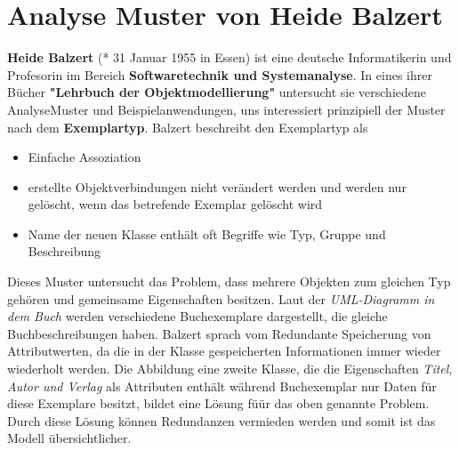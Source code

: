 \section{Analyse Muster von Heide Balzert}
\textbf{Heide Balzert} (* 31 Januar 1955 in Essen) ist eine deutsche Informatikerin und Profesorin im Bereich \textbf{Softwaretechnik und Systemanalyse}. In eines ihrer Bücher \textbf{"Lehrbuch der Objektmodellierung"} untersucht sie verschiedene AnalyseMuster und Beispielanwendungen, uns interessiert prinzipiell der Muster nach dem \textbf{Exemplartyp}. Balzert beschreibt den Exemplartyp als
\begin{itemize}
  \item{Einfache Assoziation}
  \item{erstellte Objektverbindungen nicht verändert werden und werden nur gelöscht, wenn das betrefende Exemplar gelöscht wird}
  \item{Name der neuen Klasse enthält oft Begriffe wie Typ, Gruppe und Beschreibung}
\end{itemize}
Dieses Muster untersucht das Problem, dass mehrere Objekten zum gleichen Typ gehören und gemeinsame Eigenschaften besitzen. Laut der \textit{UML-Diagramm in dem Buch} werden verschiedene Buchexemplare dargestellt, die gleiche Buchbeschreibungen haben. Balzert sprach vom Redundante Speicherung von Attributwerten, da die in der Klasse gespeicherten Informationen immer wieder wiederholt werden. Die Abbildung eine zweite Klasse, die die Eigenschaften \textit{Titel, Autor und Verlag} als Attributen enthält während Buchexemplar \cite{Balzert1955} nur Daten für diese Exemplare besitzt, bildet eine Lösung füür das oben genannte Problem. Durch diese Lösung können Redundanzen vermieden werden und somit ist das Modell übersichtlicher.

